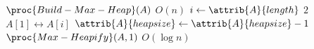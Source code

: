 \begin{codebox}
\li $\proc{Build-Max-Heap}(A)$ 
    	\Comment $O(n)$
\li \For $i \gets \attrib{A}{length}$ \Downto $2$
\li \Do
        $A[1] \leftrightarrow A[i]$
\li     $\attrib{A}{heapsize} \gets \attrib{A}{heapsize} - 1 $
\li     $\proc{Max-Heapify}(A,1)$
            \Comment $O(\log n)$
    \End
\end{codebox}